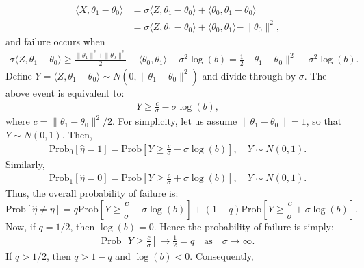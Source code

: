 \documentclass[12pt]{article}
\newcommand{\1}{\mathbf{1}}
\renewcommand{\P}{\mathrm{Prob}}
\theoremstyle{plain}
\theoremstyle{definition}
\theoremstyle{remark}
\theoremstyle{plain}
\theoremstyle{remark}
\theoremstyle{plain}
\theoremstyle{plain}
\begin{document}
%
\begin{align*}
%
\langle X , \theta_1 - \theta_0 \rangle 
&= \sigma \langle Z , \theta_1 - \theta_0 \rangle 
+ \langle \theta_0,\theta_1 - \theta_0 \rangle
\nonumber \\
&= \sigma \langle Z , \theta_1 - \theta_0 \rangle 
+ \langle \theta_0,\theta_1 \rangle - \|\theta_0\|^2,
%
\end{align*}
%
and failure occurs when 
%
\begin{align*}
%
\sigma\langle Z, \theta_1 - \theta_0 \rangle 
\ge \frac{\|\theta_1\|^2 + \|\theta_0\|^2}{2} - \langle \theta_0,\theta_1 \rangle
- \sigma^2 \log(b)
= \frac{1}{2} \|\theta_1 - \theta_0\|^2 - \sigma^2 \log(b).
%
\end{align*}
%
Define $Y = \langle Z , \theta_1 - \theta_0 \rangle \sim N(0,\|\theta_1 - \theta_0\|^2)$ and divide through by $\sigma$. The above event is equivalent to:
%
\begin{align*}
%
Y \ge \frac{c}{\sigma} - \sigma \log(b),
%
\end{align*}
%
where $c = \|\theta_1 - \theta_0\|^2 / 2$. 
For simplicity, let us assume $\| \theta_1 - \theta_0\| = 1$, so that $Y \sim N(0,1)$. Then, 
%
\begin{align*}
%
\P_0[\hat{\eta} = 1] = \P\left[Y \ge \frac{c}{\sigma} - \sigma \log(b) \right],
\quad Y \sim N(0,1).
%
\end{align*}
%
Similarly,
%
\begin{align*}
%
\P_1[\hat{\eta} = 0] = \P\left[Y \ge \frac{c}{\sigma} + \sigma \log(b) \right],
\quad Y \sim N(0,1).
%
\end{align*}
%
Thus, the overall probability of failure is:
%
\begin{equation*}
%
\P[\hat{\eta} \ne \eta] = q \P\left[Y \ge \frac{c}{\sigma} - \sigma \log(b) \right] 
+ (1-q) \P\left[Y \ge \frac{c}{\sigma} + \sigma \log(b) \right].
\end{equation*}
%
Now, if $q = 1/2$, then $\log(b) = 0$. Hence the probability of failure is simply:
%
\begin{align*}
%
\P\left[Y \ge \frac{c}{\sigma} \right] \longrightarrow \frac{1}{2} = q
\quad \text{as} \quad \sigma \to \infty.
%
\end{align*}
If $q > 1/2$, then $q > 1-q$ and $\log(b) < 0$. Consequently, 
\end{document}
